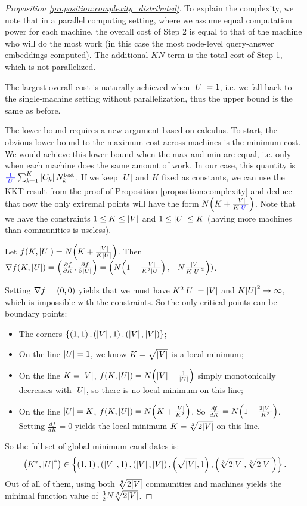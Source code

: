 \begin{proof}[Proposition \ref{proposition:complexity_distributed}]
    To explain the complexity, we note that in a parallel computing setting, where we assume equal computation power for each machine, the overall cost of Step 2 is equal to that of the machine who will do the most work (in this case the most node-level query-answer embeddings computed). The additional $KN$ term is the total cost of Step 1, which is not parallelized.

    The largest overall cost is naturally achieved when $\mathopen{}\left|U\right|=1$, i.e. we fall back to the single-machine setting without parallelization, thus the upper bound is the same as before.

    The lower bound requires a new argument based on calculus. To start, the obvious lower bound to the maximum cost across machines is the minimum cost. We would achieve this lower bound when the max and min are equal, i.e. only when each machine does the same amount of work. In our case, this quantity is $\textcolor{blue}{\frac{1}{\mathopen{}\left|U\right|}}\sum_{k=1}^{K}{\mathopen{}\left|C_k\right|N_k^{\text{test}}}$. If we keep $\mathopen{}\left|U\right|$ and $K$ fixed as constants, we can use the KKT result from the proof of Proposition \ref{proposition:complexity} and deduce that now the only extremal points will have the form $N\mathopen{}\left(K+\frac{\mathopen{}\left|V\right|}{K\textcolor{blue}{\mathopen{}\left|U\right|}}\right)$. Note that we have the constraints $1 \leq K \leq \mathopen{}\left|V\right|$ and $1 \leq \mathopen{}\left|U\right| \leq K$ (having more machines than communities is useless).

    Let $f\mathopen{}\left(K, \mathopen{}\left|U\right|\right)=N\mathopen{}\left(K+\frac{\mathopen{}\left|V\right|}{K\mathopen{}\left|U\right|}\right)$. Then $\nabla f \mathopen{}\left(K, \mathopen{}\left|U\right|\right)=\mathopen{}\left(\frac{\partial f}{\partial K},\frac{\partial f}{\partial \mathopen{}\left|U\right|}\right)=\mathopen{}\left(N\mathopen{}\left(1-\frac{\mathopen{}\left|V\right|}{K^2\mathopen{}\left|U\right|}\right), -N\frac{\mathopen{}\left|V\right|}{K\mathopen{}\left|U\right|^2}\right))$.

    Setting $\nabla f = \mathopen{}\left(0, 0\right)$ yields that we must have $K^2\mathopen{}\left|U\right|=\mathopen{}\left|V\right|$ and $K\mathopen{}\left|U\right|^2 \to \infty$, which is impossible with the constraints. So the only critical points can be boundary points:
    \begin{itemize}
        \item The corners $\mathopen{}\left\{\mathopen{}\left(1, 1\right), \mathopen{}\left(\mathopen{}\left|V\right|, 1\right), \mathopen{}\left(\mathopen{}\left|V\right|,\mathopen{}\left|V\right|\right)\right\}$;
        \item On the line $\mathopen{}\left|U\right|=1$, we know $K=\sqrt{\mathopen{}\left|V\right|}$ is a local minimum;
        \item On the line $K=\mathopen{}\left|V\right|$, $f\mathopen{}\left(K, \mathopen{}\left|U\right|\right)=N\mathopen{}\left(\mathopen{}\left|V\right|+\frac{1}{\mathopen{}\left|U\right|}\right)$ simply monotonically decreases with $\mathopen{}\left|U\right|$, so there is no local minimum on this line;
        \item On the line $\mathopen{}\left|U\right|=K$, $f\mathopen{}\left(K, \mathopen{}\left|U\right|\right)=N\mathopen{}\left(K+\frac{\mathopen{}\left|V\right|}{K^2}\right)$. So $\frac{d f}{d K}=N\mathopen{}\left(1-\frac{2\mathopen{}\left|V\right|}{K^3}\right)$. Setting $\frac{d f}{d K}=0$ yields the local minimum $K=\sqrt[3]{2\mathopen{}\left|V\right|}$ on this line.
    \end{itemize}
    So the full set of global minimum candidates is: $$\mathopen{}\left(K^*, \mathopen{}\left|U\right|^*\right) \in \mathopen{}\left\{\mathopen{}\left(1, 1\right), \mathopen{}\left(\mathopen{}\left|V\right|, 1\right), \mathopen{}\left(\mathopen{}\left|V\right|,\mathopen{}\left|V\right|\right), \mathopen{}\left(\sqrt{\mathopen{}\left|V\right|}, 1\right), \mathopen{}\left(\sqrt[3]{2\mathopen{}\left|V\right|}, \sqrt[3]{2\mathopen{}\left|V\right|}\right) \right\}.$$ Out of all of them, using both $\sqrt[3]{2\mathopen{}\left|V\right|}$ communities and machines yields the minimal function value of $\frac{3}{2}N\sqrt[3]{2\mathopen{}\left|V\right|}$.
\end{proof}

